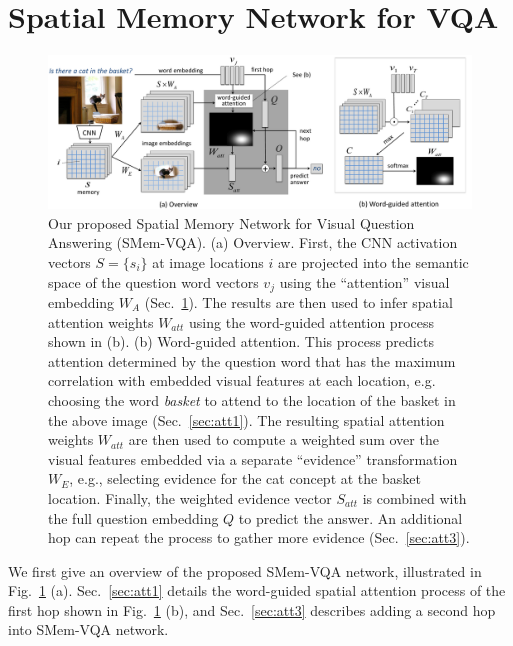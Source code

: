 \vspace{-0.05in}
\section{Spatial Memory Network for VQA}\label{sec:smem}
\vspace{-0.05in}

\begin{figure}[t!]
\centering
\includegraphics[width=.9\linewidth]{figures/overview_new2.pdf}
\vspace{-0.05in}
\caption{Our proposed Spatial Memory Network for Visual Question Answering (SMem-VQA). (a) Overview. First, the CNN activation vectors $S=\{s_i\}$ at image locations $i$ are projected into the semantic space of the question word vectors $v_j$ using the ``attention'' visual embedding $W_A$ (Sec.~\ref{sec:smem}). The results are then used to infer spatial attention weights $W_{att}$ using the word-guided attention process shown in (b). 
(b) Word-guided attention. This process predicts attention determined by the question word that has the maximum correlation with embedded visual features at each location, e.g. choosing the word \textit{basket} to attend to the location of the basket in the above image (Sec.~\ref{sec:att1}).
The resulting spatial attention weights $W_{att}$ are then used to compute a weighted sum over the visual features embedded via a separate ``evidence'' transformation $W_E$, e.g., selecting evidence for the cat concept at the basket location. Finally, the weighted evidence vector $S_{att}$ is combined with the full question embedding $Q$ to predict the answer. An additional hop can repeat the process to gather more evidence (Sec.~\ref{sec:att3}). 
}
\label{fig:illus}
\vspace{-0.15in}
\end{figure}

We first give an overview of the proposed SMem-VQA network, illustrated in Fig.~\ref{fig:illus} (a). Sec.~\ref{sec:att1} details the word-guided spatial attention process of the first hop shown in Fig.~\ref{fig:illus} (b), and Sec.~\ref{sec:att3} describes adding a second hop into SMem-VQA network.

